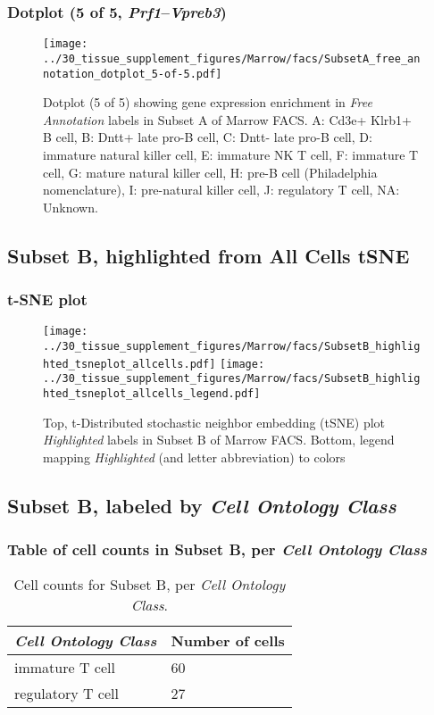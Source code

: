 \clearpage

\subsubsection{Dotplot (5 of 5, \emph{Prf1}--\emph{Vpreb3})}
\begin{figure}[h]
\centering
\texttt{[image: ../30\_tissue\_supplement\_figures/Marrow/facs/SubsetA\_free\_annotation\_dotplot\_5-of-5.pdf]}

\caption{ Dotplot (5 of 5)  showing gene expression enrichment in \emph{Free Annotation} labels in Subset A of Marrow FACS. A: Cd3e+ Klrb1+ B cell, B: Dntt+ late pro-B cell, C: Dntt- late pro-B cell, D: immature natural killer cell, E: immature NK T cell, F: immature T cell, G: mature natural killer cell, H: pre-B cell (Philadelphia nomenclature), I: pre-natural killer cell, J: regulatory T cell, NA: Unknown.}
\end{figure}


\clearpage
\subsection{Subset B, highlighted from All Cells tSNE}
\subsubsection{t-SNE plot}
\begin{figure}[h]
\centering
\texttt{[image: ../30\_tissue\_supplement\_figures/Marrow/facs/SubsetB\_highlighted\_tsneplot\_allcells.pdf]}
\texttt{[image: ../30\_tissue\_supplement\_figures/Marrow/facs/SubsetB\_highlighted\_tsneplot\_allcells\_legend.pdf]}
\caption{Top, t-Distributed stochastic neighbor embedding (tSNE) plot  \emph{Highlighted} labels in Subset B of Marrow FACS. Bottom, legend mapping \emph{Highlighted} (and letter abbreviation) to colors}
\end{figure}


\clearpage

\subsection{Subset B, labeled by \emph{Cell Ontology Class}}
\subsubsection{Table of cell counts in Subset B, per \emph{Cell Ontology Class}}\begin{table}[h]
\centering
\label{my-label}
\begin{tabular}{@{}ll@{}}
\toprule

\emph{Cell Ontology Class}& Number of cells \\ \midrule
immature T cell & 60 \\

regulatory T cell & 27 \\
\bottomrule
\end{tabular}
\caption{Cell counts for Subset B, per \emph{Cell Ontology Class}.}
\end{table}

